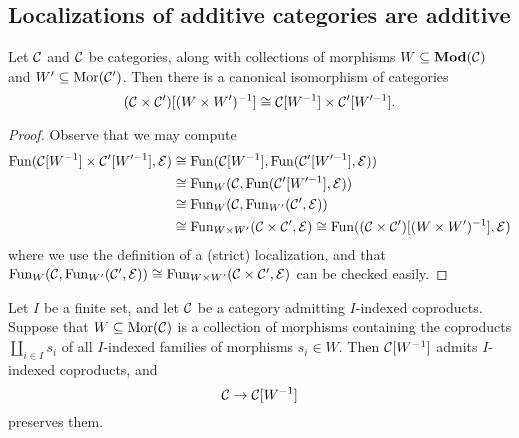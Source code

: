 \subsection{Localizations of additive categories are additive}
\begin{lemma}\label{lemma:product-of-localizations}
	Let \(\mathcal{C}\) and \(\mathcal{C}\) be categories, along with collections of morphisms \(W\subseteq\mathbf{Mod}(\mathcal{C})\) and \(W'\subseteq\operatorname{Mor}(\mathcal{C}')\). Then there is a canonical
	isomorphism of categories
	\[ (\mathcal{C}\times\mathcal{C}')[(W\times W')^{-1}] \cong \mathcal{C}[W^{-1}]\times\mathcal{C}'[W'^{-1}].\]
\end{lemma}
\begin{proof}
Observe that we may compute
\begin{align*}
	\operatorname{Fun}(\mathcal{C}[W^{-1}]\times\mathcal{C}'[W'^{-1}],\mathcal{E}) &\cong \operatorname{Fun}(\mathcal{C}[W^{-1}],\operatorname{Fun}(\mathcal{C}'[W'^{-1}],\mathcal{E}))\\
	&\cong \operatorname{Fun}_W(\mathcal{C},\operatorname{Fun}(\mathcal{C}'[W'^{-1}],\mathcal{E}))\\
	&\cong \operatorname{Fun}_W(\mathcal{C},\operatorname{Fun}_{W'}(\mathcal{C}',\mathcal{E}))\\
	&\cong \operatorname{Fun}_{W\times W'}(\mathcal{C}\times\mathcal{C}',\mathcal{E}) \cong \operatorname{Fun}( (\mathcal{C}\times\mathcal{C}')[(W\times W')^{-1}],\mathcal{E} )
\end{align*}
where we use the definition of a (strict) localization, and that \(\operatorname{Fun}_W(\mathcal{C},\operatorname{Fun}_{W'}(\mathcal{C}',\mathcal{E})) \cong \operatorname{Fun}_{W\times W'}(\mathcal{C}\times\mathcal{C}',\mathcal{E})\) can be checked easily.
\end{proof}
\begin{corollary}\label{corollary:localization-admits-coproducts}
	Let \(I\) be a finite set, and let \(\mathcal{C}\) be a category admitting \(I\)-indexed coproducts. Suppose that \(W\subseteq\operatorname{Mor}(\mathcal{C})\) is a collection of morphisms containing
	the coproducts \(\amalg_{i\in I}s_i\) of all \(I\)-indexed families of morphisms \(s_i\in W\). Then \(\mathcal{C}[W^{-1}]\) admits \(I\)-indexed coproducts, and
	\[ \mathcal{C}\to\mathcal{C}[W^{-1}] \]
	preserves them.
\end{corollary}
